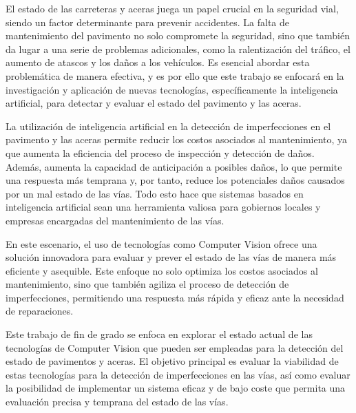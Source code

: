 El estado de las carreteras y aceras juega un papel crucial en la seguridad vial, siendo un
factor determinante para prevenir accidentes. La falta de mantenimiento del pavimento no
solo compromete la seguridad, sino que también da lugar a una serie de problemas
adicionales, como la ralentización del tráfico, el aumento de atascos y los daños a los
vehículos. Es esencial abordar esta problemática de manera efectiva, y es por ello que este
trabajo se enfocará en la investigación y aplicación de nuevas tecnologías, específicamente
la inteligencia artificial, para detectar y evaluar el estado del pavimento y las aceras.

La utilización de inteligencia artificial en la detección de imperfecciones en el pavimento y
las aceras permite reducir los costos asociados al mantenimiento, ya que aumenta la eficiencia
del proceso de inspección y detección de daños. Además, aumenta la capacidad de anticipación
a posibles daños, lo que permite una respuesta más temprana y, por tanto, reduce los potenciales
daños causados por un mal estado de las vías. Todo esto hace que sistemas basados en inteligencia
artificial sean una herramienta valiosa para gobiernos locales y empresas encargadas del mantenimiento
de las vías.

En este escenario, el uso de tecnologías como Computer Vision ofrece una solución
innovadora para evaluar y prever el estado de las vías de manera más eficiente y asequible.
Este enfoque no solo optimiza los costos asociados al mantenimiento, sino que también
agiliza el proceso de detección de imperfecciones, permitiendo una respuesta más rápida y
eficaz ante la necesidad de reparaciones.

Este trabajo de fin de grado se enfoca en explorar el estado actual de las tecnologías de
Computer Vision que pueden ser empleadas para la detección del estado de pavimentos y
aceras. El objetivo principal es evaluar la viabilidad de estas tecnologías para la detección
de imperfecciones en las vías, así como evaluar la posibilidad de implementar un sistema
eficaz y de bajo coste que permita una evaluación precisa y temprana del estado de las vías.